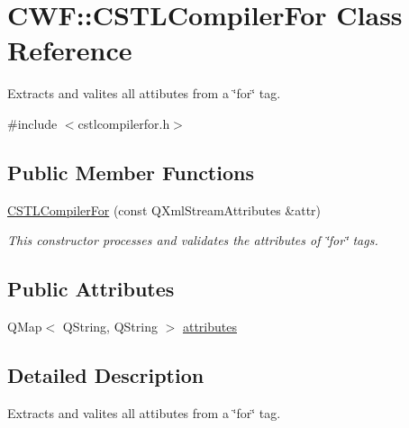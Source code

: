 \hypertarget{class_c_w_f_1_1_c_s_t_l_compiler_for}{\section{C\+W\+F\+:\+:C\+S\+T\+L\+Compiler\+For Class Reference}
\label{class_c_w_f_1_1_c_s_t_l_compiler_for}
}


Extracts and valites all attibutes from a \char`\"{}for\char`\"{} tag.  




{\ttfamily \#include $<$cstlcompilerfor.\+h$>$}

\subsection*{Public Member Functions}
\begin{DoxyCompactItemize}
\item 
\hyperlink{class_c_w_f_1_1_c_s_t_l_compiler_for_a43830cd5b6f25d5ec2fd156b141c04f3}{C\+S\+T\+L\+Compiler\+For} (const Q\+Xml\+Stream\+Attributes \&attr)
\begin{DoxyCompactList}\small\item\em This constructor processes and validates the attributes of \char`\"{}for\char`\"{} tags. \end{DoxyCompactList}\end{DoxyCompactItemize}
\subsection*{Public Attributes}
\begin{DoxyCompactItemize}
\item 
Q\+Map$<$ Q\+String, Q\+String $>$ \hyperlink{class_c_w_f_1_1_c_s_t_l_compiler_for_ab90c925cb83704f2e22f19cdf9d48974}{attributes}
\end{DoxyCompactItemize}


\subsection{Detailed Description}
Extracts and valites all attibutes from a \char`\"{}for\char`\"{} tag. 

